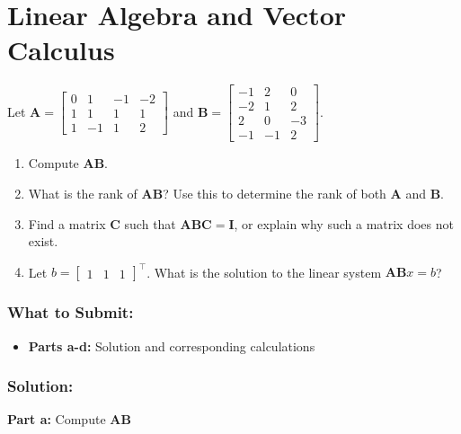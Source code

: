 \documentclass{article}
\begin{document}
\section*{Linear Algebra and Vector Calculus}
\begin{aprob}
    Let $\mathbf{A} = \begin{bmatrix}
            0 & 1 & -1 & -2 \\
            1 & 1 & 1 & 1 \\
            1 & -1 & 1 & 2
        \end{bmatrix}$ and $\mathbf{B} = \begin{bmatrix}
            -1 & 2 & 0 \\
            -2 & 1 & 2 \\
            2 & 0 & -3 \\
            -1 & -1 & 2
        \end{bmatrix}$.
    \begin{enumerate} 
        \item{} Compute $\mathbf{AB}$.
        \item{} What is the rank of $\mathbf{AB}$? Use this to determine the rank of both $\mathbf{A}$ and $\mathbf{B}$.
        \item{} Find a matrix $\mathbf{C}$ such that $\mathbf{ABC} = \mathbf{I}$, or explain why such a matrix does not exist.
        \item{} Let $b = \begin{bmatrix}
            1 &
            1 &
            1
        \end{bmatrix}^\top$. What is the solution to the linear system $\mathbf{A} \mathbf{B} x = b$?
    \end{enumerate}
    
    \subsubsection*{What to Submit:}
    \begin{itemize}
        \item \textbf{Parts a-d:} Solution and corresponding calculations
    \end{itemize}

    \subsubsection*{Solution:}

    \begin{mdframed}
    \textbf{\large Part a:} Compute $\mathbf{AB}$
    \end{mdframed}


\end{aprob}
\end{document}
